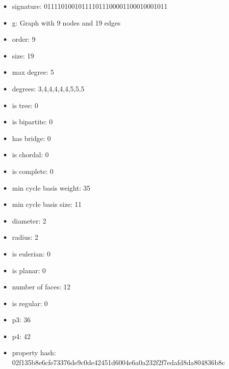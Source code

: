 \newpage
\begin{figure}
\end{figure}
\begin{itemize}
\item signature: 011110100101111011100001100010001011
\item g: Graph with 9 nodes and 19 edges
\item order: 9
\item size: 19
\item max degree: 5
\item degrees: 3,4,4,4,4,4,5,5,5
\item is tree: 0
\item is bipartite: 0
\item has bridge: 0
\item is chordal: 0
\item is complete: 0
\item min cycle basis weight: 35
\item min cycle basis size: 11
\item diameter: 2
\item radius: 2
\item is eulerian: 0
\item is planar: 0
\item number of faces: 12
\item is regular: 0
\item p3: 36
\item p4: 42
\item property hash: 02f135b8e6cfe73376de9c0de42451d6004e6a0a232f2f7edafd8da804836b8c
\end{itemize}
